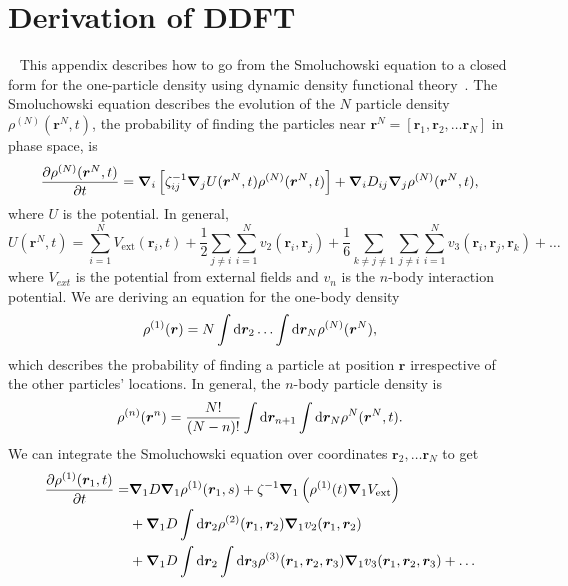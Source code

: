 \chapter{Derivation of DDFT}~\label{appx:ddft}
This appendix describes how to go from the Smoluchowski equation to a closed
form for the one-particle density using dynamic density functional
theory~\cite{archer_dynamical_04}.  The Smoluchowski equation describes the
evolution of the $N$ particle density $\rho^{(N)}(\bm{r}^N,t)$,  the probability
of finding the particles near $\bm{r}^N = [ \bm{r}_1, \bm{r}_2, \ldots
\bm{r}_N]$ in phase space, is
\begin{equation}
  \frac{\partial\rho^{(N)}(\bm{r}^N,t) }{\partial t} =
  \bm{\nabla}_i
  \left[ \zeta_{ij}^{-1} \bm{\nabla}_j U(\bm{r}^N,t) 
    \rho^{(N)}(\bm{r}^N, t) \right] 
   + \bm{\nabla}_i D_{ij} \bm{\nabla}_j
   \rho^{(N)}(\bm{r}^N, t),
\end{equation}
%
where $U$ is the potential. In general, 
%
\begin{equation}
  U( \bm{r}^N, t ) = \sum_{i=1}^N V_{\text{ext}}(\bm{r}_i,t)
  + \frac{1}{2} \sum_{j \neq i} \sum_{i=1}^N v_2( \bm{r}_i, \bm{r}_j )
  + \frac{1}{6} \sum_{k \neq j \neq 1} \sum_{j \neq i} 
  \sum_{i=1}^N v_3( \bm{r}_i, \bm{r}_j, \bm{r}_k )
  + \ldots
\end{equation}
%
where $V_{ext}$ is the potential from external fields and $v_n$ is the $n$-body
interaction potential.  We are deriving an equation for the
one-body density
%
\begin{equation}
  \rho^{(1)}(\bm{r}) = N \int \mathop{}\!\mathrm{d} \bm{r}_2 \ldots \int \mathop{}\!\mathrm{d} \bm{r}_N 
  \rho^{(N)}( \bm{r}^N ),
\end{equation}
%
which describes the probability of finding a particle at position $\bm{r}$
irrespective of the other particles' locations.  In general, the $n$-body
particle density is~\cite{hansen_theory_06}
%
\begin{equation}
  \rho^{(n)}(\bm{r}^n) = \frac{N!}{(N-n)!} \int \mathop{}\!\mathrm{d} \bm{r}_{n+1} 
  \int \mathop{}\!\mathrm{d} \bm{r}_N 
  \rho^{N}( \bm{r}^N , t ).
\end{equation}
%
We can integrate the Smoluchowski equation over coordinates $\bm{r}_2, \ldots
\bm{r}_N$ to get 
%
\begin{align}
  \label{eqn:pde_open}
  \frac{\partial\rho^{(1)}(\bm{r}_1,t) }{\partial t} =&
  \bm{\nabla}_1 D \bm{\nabla}_1  
   \rho^{(1)}(\bm{r}_1, s)
  + \zeta^{-1} \bm{\nabla}_1 
  \left( \rho^{(1)}(t) \bm{\nabla}_1 V_{\text{ext}} \right) \\
  &+ \bm{\nabla}_1 D \int \mathop{}\!\mathrm{d} \bm{r}_2 \rho^{(2)}(\bm{r}_1,\bm{r}_2) 
  \bm{\nabla}_1 v_2 (\bm{r}_1, \bm{r}_2 ) \\
  &+ \bm{\nabla}_1 D \int \mathop{}\!\mathrm{d} \bm{r}_2 \int \mathop{}\!\mathrm{d} \bm{r}_3 
  \rho^{(3)}(\bm{r}_1,\bm{r}_2,\bm{r}_3) \bm{\nabla}_1 v_3
  (\bm{r}_1, \bm{r}_2, \bm{r}_3) + \ldots
\end{align}
